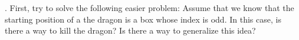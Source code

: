 \begin{hint}.
	First, try to solve the following easier problem: Assume that we know that the starting position of a the dragon is a box whose index is odd. In this case, is there a way to kill the dragon? Is there a way to generalize this idea?
\end{hint}